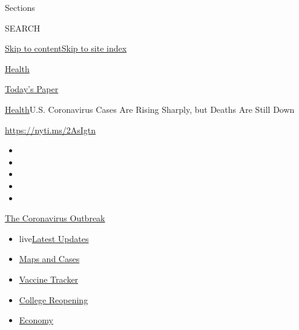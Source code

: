 Sections

SEARCH

\protect\hyperlink{site-content}{Skip to
content}\protect\hyperlink{site-index}{Skip to site index}

\href{https://www.nytimes3xbfgragh.onion/section/health}{Health}

\href{https://myaccount.nytimes3xbfgragh.onion/auth/login?response_type=cookie\&client_id=vi}{}

\href{https://www.nytimes3xbfgragh.onion/section/todayspaper}{Today's
Paper}

\href{/section/health}{Health}\textbar{}U.S. Coronavirus Cases Are
Rising Sharply, but Deaths Are Still Down

\url{https://nyti.ms/2AsIgtn}

\begin{itemize}
\item
\item
\item
\item
\item
\end{itemize}

\href{https://www.nytimes3xbfgragh.onion/news-event/coronavirus?action=click\&pgtype=Article\&state=default\&region=TOP_BANNER\&context=storylines_menu}{The
Coronavirus Outbreak}

\begin{itemize}
\tightlist
\item
  live\href{https://www.nytimes3xbfgragh.onion/2020/08/04/world/coronavirus-cases.html?action=click\&pgtype=Article\&state=default\&region=TOP_BANNER\&context=storylines_menu}{Latest
  Updates}
\item
  \href{https://www.nytimes3xbfgragh.onion/interactive/2020/us/coronavirus-us-cases.html?action=click\&pgtype=Article\&state=default\&region=TOP_BANNER\&context=storylines_menu}{Maps
  and Cases}
\item
  \href{https://www.nytimes3xbfgragh.onion/interactive/2020/science/coronavirus-vaccine-tracker.html?action=click\&pgtype=Article\&state=default\&region=TOP_BANNER\&context=storylines_menu}{Vaccine
  Tracker}
\item
  \href{https://www.nytimes3xbfgragh.onion/2020/08/02/us/covid-college-reopening.html?action=click\&pgtype=Article\&state=default\&region=TOP_BANNER\&context=storylines_menu}{College
  Reopening}
\item
  \href{https://www.nytimes3xbfgragh.onion/live/2020/08/04/business/stock-market-today-coronavirus?action=click\&pgtype=Article\&state=default\&region=TOP_BANNER\&context=storylines_menu}{Economy}
\end{itemize}


